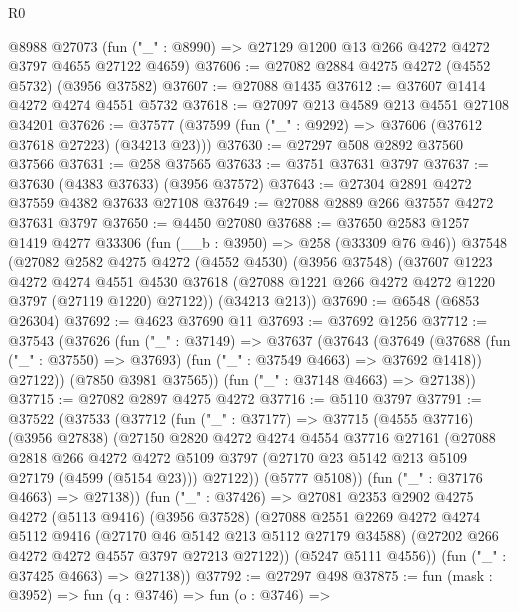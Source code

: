 \begin{lexlean}{R0}
\begin{coremodule}
    @8988
    @27073
    (fun ("_" : @8990) => @27129 @1200 @13 @266 @4272 @4272 @3797 @4655 @27122 @4659)
@37606 := @27082 @2884 @4275 @4272 (@4552 @5732) (@3956 @37582)
@37607 := @27088 @1435
@37612 := @37607 @1414 @4272 @4274 @4551 @5732
@37618 := @27097 @213 @4589 @213 @4551 @27108 @34201
@37626 := @37577 (@37599 (fun ("_" : @9292) => @37606 (@37612 @37618 @27223) (@34213 @23)))
@37630 := @27297 @508 @2892 @37560 @37566
@37631 := @258 @37565
@37633 := @3751 @37631 @3797
@37637 := @37630 (@4383 @37633) (@3956 @37572)
@37643 := @27304 @2891 @4272 @37559 @4382 @37633 @27108
@37649 := @27088 @2889 @266 @37557 @4272 @37631 @3797
@37650 := @4450 @27080
@37688 := @37650
    @2583
    @1257
    @1419
    @4277
    @33306
    (fun (__b : @3950) => @258 (@33309 @76 @46))
    @37548
    (@27082
      @2582
      @4275
      @4272
      (@4552 @4530)
      (@3956 @37548)
      (@37607
        @1223
        @4272
        @4274
        @4551
        @4530
        @37618
        (@27088 @1221 @266 @4272 @4272 @1220 @3797 (@27119 @1220) @27122))
      (@34213 @213))
@37690 := @6548 (@6853 @26304)
@37692 := @4623 @37690 @11
@37693 := @37692 @1256
@37712 := @37543
    (@37626
      (fun ("_" : @37149) =>
      @37637
        (@37643
          (@37649
            (@37688 (fun ("_" : @37550) => @37693) (fun ("_" : @37549 @4663) => @37692 @1418))
            @27122))
        (@7850 @3981 @37565))
      (fun ("_" : @37148 @4663) => @27138))
@37715 := @27082 @2897 @4275 @4272
@37716 := @5110 @3797
@37791 := @37522
    (@37533
      (@37712
        (fun ("_" : @37177) =>
        @37715
          (@4555 @37716)
          (@3956 @27838)
          (@27150
            @2820
            @4272
            @4274
            @4554
            @37716
            @27161
            (@27088
              @2818
              @266
              @4272
              @4272
              @5109
              @3797
              (@27170 @23 @5142 @213 @5109 @27179 (@4599 (@5154 @23)))
              @27122))
          (@5777 @5108))
        (fun ("_" : @37176 @4663) => @27138))
      (fun ("_" : @37426) =>
      @27081
        @2353
        @2902
        @4275
        @4272
        (@5113 @9416)
        (@3956 @37528)
        (@27088
          @2551
          @2269
          @4272
          @4274
          @5112
          @9416
          (@27170 @46 @5142 @213 @5112 @27179 @34588)
          (@27202 @266 @4272 @4272 @4557 @3797 @27213 @27122))
        (@5247 @5111 @4556))
      (fun ("_" : @37425 @4663) => @27138))
@37792 := @27297 @498
@37875 := fun (mask : @3952) =>
  fun (q : @3746) =>
  fun (o : @3746) =>

\end{coremodule}
\end{lexlean}
